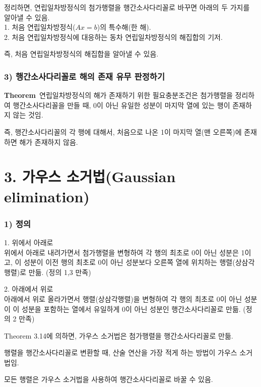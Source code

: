 정리하면, 연립일차방정식의 첨가행렬을 행간소사다리꼴로 바꾸면 아래의 두 가지를 알아낼 수 있음.\\
1. 처음 연립일차방정식($Ax=b$)의 특수해(한 해).\\
2. 처음 연립일차방정식에 대응하는 동차 연립일차방정식의 해집합의 기저.

즉, 처음 연립일차방정식의 해집합을 알아낼 수 있음.

\subsubsection*{3) 행간소사다리꼴로 해의 존재 유무 판정하기}
\textbf{Theorem}\, 연립일차방정식의 해가 존재하기 위한 필요충분조건은 첨가행렬을 정리하여 행간소사다리꼴을 만들 때, 0이 아닌 유일한 성분이 마지막 열에 있는 행이 존재하지 않는 것임.

즉, 행간소사다리꼴의 각 행에 대해서, 처음으로 나온 1이 마지막 열(맨 오른쪽)에 존재하면 해가 존재하지 않음.\\


\section*{3. 가우스 소거법(Gaussian elimination)}
\subsubsection*{1) 정의\\}
\begin{DEF}
1. 위에서 아래로\\
위에서 아래로 내려가면서 첨가행렬을 변형하여 각 행의 최초로 0이 아닌 성분은 1이고, 이 성분이 이전 행의 최초로 0이 아닌 성분보다 오른쪽 열에 위치하는 행렬(상삼각행렬)로 만듦. (정의 1,3 만족)

2. 아래에서 위로\\
아래에서 위로 올라가면서 행렬(상삼각행렬)을 변형하여 각 행의 최초로 0이 아닌 성분이 이 성분을 포함하는 열에서 유일하게 0이 아닌 성분인 행간소사다리꼴로 만듦. (정의 2 만족)
\end{DEF}

Theorem 3.14에 의하면, 가우스 소거법은 첨가행렬을 행간소사다리꼴로 만듦.

행렬을 행간소사다리꼴로 변환할 때, 산술 연산을 가장 적게 하는 방법이 가우스 소거법임.

모든 행렬은 가우스 소거법을 사용하여 행간소사다리꼴로 바꿀 수 있음.\\


\newpage


